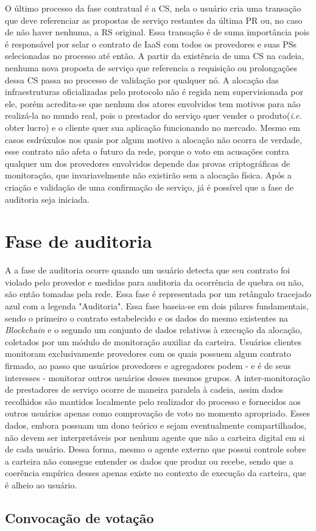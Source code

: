 O último processo da fase contratual é a \ac{CS}, nela o usuário cria uma transação que deve referenciar as propostas de serviço restantes da última \ac{PR} ou, no caso de não haver nenhuma, a \ac{RS} original. Essa transação é de suma importância pois é responsável por selar o contrato de \ac{IaaS} com todos os provedores e suas \acp{PS} selecionadas no processo até então. A partir da existência de uma \ac{CS} na cadeia, nenhuma nova proposta de serviço que referencia a requisição ou prolongações dessa \ac{CS} passa no processo de validação por qualquer nó. A alocação das infraestruturas oficializadas pelo protocolo não é regida nem supervisionada por ele, porém acredita-se que nenhum dos atores envolvidos tem motivos para não realizá-la no mundo real, pois o prestador do serviço quer vender o produto(\textit{i.e.} obter lucro) e o cliente quer sua aplicação funcionando no mercado. Mesmo em casos esdrúxulos nos quais por algum motivo a alocação não ocorra de verdade, esse contrato não afeta o futuro da rede, porque o voto em acusações contra qualquer um dos provedores envolvidos depende das provas criptográficas de monitoração, que invariavelmente não existirão sem a alocação física. Após a criação e validação de uma confirmação de serviço, já é possível que a fase de auditoria seja iniciada.

\section{Fase de auditoria}
\label{sec:proposta:fase_auditoria}

A a fase de auditoria ocorre quando um usuário detecta que seu contrato foi violado pelo provedor e medidas para auditoria da ocorrência de quebra ou não, são então tomadas pela rede. Essa fase é representada por um retângulo tracejado azul com a legenda "Auditoria". Essa fase baseia-se em dois pilares fundamentais, sendo o primeiro o contrato estabelecido e os dados do mesmo existentes na \textit{Blockchain} e o segundo um conjunto de dados relativos à execução da alocação, coletados por um módulo de monitoração auxiliar da carteira. Usuários clientes monitoram exclusivamente provedores com os quais possuem algum contrato firmado, ao passo que usuários provedores e agregadores podem - e é de seus interesses - monitorar outros usuários desses mesmos grupos. A inter-monitoração de prestadores de serviço ocorre de maneira paralela à cadeia, assim dados recolhidos são mantidos localmente pelo realizador do processo e fornecidos aos outros usuários apenas como comprovação de voto no momento apropriado. Esses dados, embora possuam um dono teórico e sejam eventualmente compartilhados, não devem ser interpretáveis por nenhum agente que não a carteira digital em si de cada usuário. Dessa forma, mesmo o agente externo que possui controle sobre a carteira não consegue entender os dados que produz ou recebe, sendo que a coerência empírica desses apenas existe no contexto de execução da carteira, que é alheio ao usuário.

\subsection{Convocação de votação}
\label{sec:proposta:auditoria:cv}

